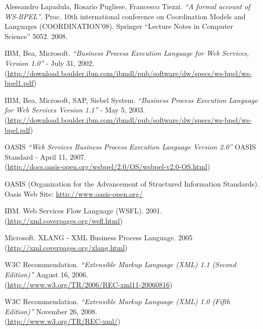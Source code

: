 \begin{thebibliography}{99}

 Alessandro Lapadula, Rosario Pugliese, Francesco
Tiezzi. \emph{``A formal account of WS-BPEL''}. Proc. 10th international
conference on Coordination Models and Languages (COORDINATION'08). Springer ``Lecture Notes in Computer Science''
5052. 2008.

 IBM, Bea, Microsoft. \emph{``Business Process Execution
Language for Web Services, Version 1.0''} - July 31, 2002. \\
(\href{http://download.boulder.ibm.com/ibmdl/pub/software/dw/specs/ws-bpel/ws-bpel1.pdf}{http://download.boulder.ibm.com/ibmdl/pub/software/dw/specs/ws-bpel/ws-bpel1.pdf})

 IBM, Bea, Microsoft, SAP, Siebel System. \emph{``Business
Process Execution Language for Web Services Version 1.1''} - May 5, 2003. \\
(\href{http://download.boulder.ibm.com/ibmdl/pub/software/dw/specs/ws-bpel/ws-bpel.pdf}{http://download.boulder.ibm.com/ibmdl/pub/software/dw/specs/ws-bpel/ws-bpel.pdf})

 OASIS \emph{``Web Services Business Process Execution
Language Version 2.0''} OASIS Standard - April 11, 2007. \\
(\href{http://docs.oasis-open.org/wsbpel/2.0/OS/wsbpel-v2.0-OS.html}{http://docs.oasis-open.org/wsbpel/2.0/OS/wsbpel-v2.0-OS.html})

 OASIS (Organization for the Advancement of Structured
Information Standards). \\
Oasis Web Site:
\href{http://www.oasis-open.org/}{http://www.oasis-open.org/}

 IBM. Web Services Flow Language (WSFL). 2001.\\
(\href{http://xml.coverpages.org/wsfl.html}{http://xml.coverpages.org/wsfl.html})

 Microsoft. XLANG - XML Business Process Language. 2005 \\
(\href{http://xml.coverpages.org/xlang.html}{http://xml.coverpages.org/xlang.html})

 W3C Recommendation. \emph{``Extensible Markup Language (XML) 1.1
(Second Edition)''} August 16, 2006.\\
(\href{http://www.w3.org/TR/2006/REC-xml11-20060816}{http://www.w3.org/TR/2006/REC-xml11-20060816})

 W3C Recommendation. \emph{``Extensible Markup Language (XML) 1.0
(Fifth Edition)''} November 26, 2008.\\
(\href{http://www.w3.org/TR/REC-xml/}{http://www.w3.org/TR/REC-xml/})


\end{thebibliography}
